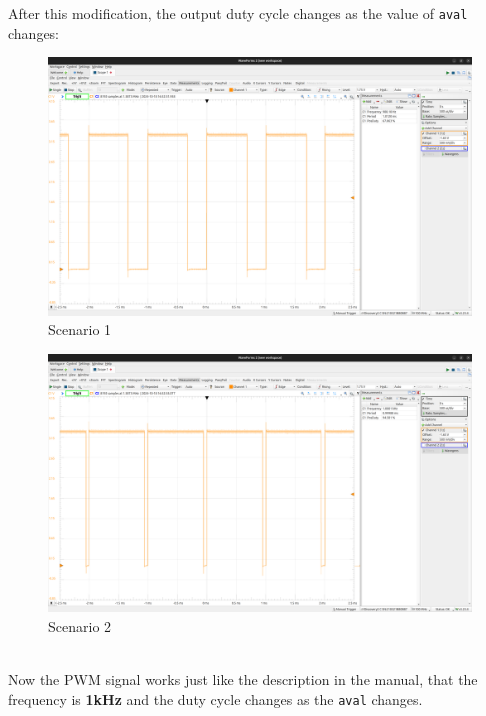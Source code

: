 \documentclass{report}
\begin{document}
   After this modification, the output duty cycle changes as the value of \texttt{aval} changes:\\
   \begin{minipage}{0.49\textwidth}
    \begin{figure}[H]
    \includegraphics[width=\textwidth]{scope2.png}
    \caption{Scenario 1}
    \end{figure}
    \end{minipage}
    \hfill
    \begin{minipage}{0.49\textwidth}
        \begin{figure}[H]
        \includegraphics[width=\textwidth]{scope3.png}
        \caption{Scenario 2}
        \end{figure}
    \end{minipage}\\[0.5em]
    Now the PWM signal works just like the description in the manual, that the frequency is \textbf{1kHz} and the duty cycle changes as the \texttt{aval} changes. \\[1em]
\end{document}
